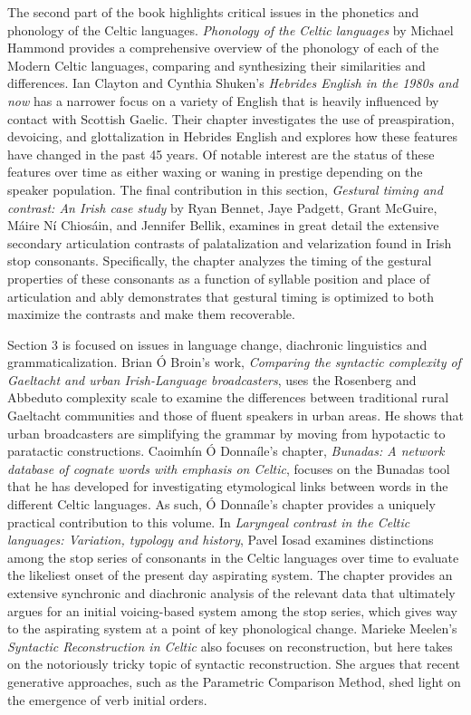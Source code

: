 \documentclass[output=paper]{langscibook}
\begin{document}
The second part of the book highlights critical issues in the phonetics and phonology of the Celtic languages. \textit{Phonology of the Celtic languages} by Michael Hammond provides a comprehensive overview of the phonology of each of the Modern Celtic languages, comparing and synthesizing their similarities and differences. Ian Clayton and Cynthia Shuken’s \textit{Hebrides English in the 1980s and now} has a narrower focus on a variety of English that is heavily influenced by contact with Scottish Gaelic. Their chapter investigates the use of preaspiration, devoicing, and glottalization in Hebrides English and explores how these features have changed in the past 45 years. Of notable interest are the status of these features over time as either waxing or waning in prestige depending on the speaker population. The final contribution in this section, \textit{Gestural timing and contrast: An Irish case study} by Ryan Bennet, Jaye Padgett, Grant McGuire, Máire Ní Chiosáin, and Jennifer Bellik, examines in great detail the extensive secondary articulation contrasts of palatalization and velarization found in Irish stop consonants. Specifically, the chapter analyzes the timing of the gestural properties of these consonants as a function of syllable position and place of articulation and ably demonstrates that gestural timing is optimized to both maximize the contrasts and make them recoverable. 

Section 3 is focused on issues in language change, diachronic linguistics and grammaticalization. Brian Ó Broin’s work, \textit{Comparing the syntactic complexity of Gaeltacht and urban Irish-Language broadcasters}, uses the Rosenberg and Abbeduto complexity scale to examine the differences between traditional rural Gaeltacht communities and those of fluent speakers in urban areas. He shows that urban broadcasters are simplifying the grammar by moving from hypotactic to paratactic constructions. Caoimhín Ó Donnaíle’s chapter, \textit{Bunadas: A network database of cognate words with emphasis on Celtic}, focuses on the Bunadas tool that he has developed for investigating etymological links between words in the different Celtic languages. As such, Ó Donnaíle’s chapter provides a uniquely practical contribution to this volume. In \textit{Laryngeal contrast in the Celtic languages: Variation, typology and history}, Pavel Iosad examines distinctions among the stop series of consonants in the Celtic languages over time to evaluate the likeliest onset of the present day aspirating system. The chapter provides an extensive synchronic and diachronic analysis of the relevant data that ultimately argues for an initial voicing-based system among the stop series, which  gives way to the aspirating system at a point of key phonological change. Marieke Meelen’s \textit{Syntactic Reconstruction in Celtic} also focuses on reconstruction, but here takes on the notoriously tricky topic of syntactic reconstruction. She argues that recent generative approaches, such as the Parametric Comparison Method, shed light on the emergence of verb initial orders.
\end{document}
